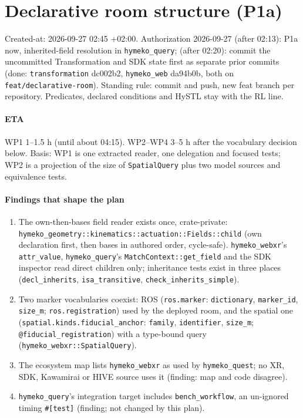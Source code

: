 \documentclass[11pt]{article}
\begin{document}
\section*{Declarative room structure (P1a)}
Created-at: 2026-09-27 02:45 +02:00. Authorization 2026-09-27 (after 02:13): P1a now, inherited-field
resolution in \texttt{hymeko\_query}; (after 02:20): commit the uncommitted Transformation and SDK state
first as separate prior commits (done: \texttt{transformation} dc002b2, \texttt{hymeko\_web}
da94b0b, both on \texttt{feat/declarative-room}). Standing rule: commit and push, new feat branch
per repository. Predicates, declared conditions and HySTL stay with the RL line.

\paragraph{ETA} WP1 1--1.5 h (until about 04:15). WP2--WP4 3--5 h after the vocabulary decision
below. Basis: WP1 is one extracted reader, one delegation and focused tests; WP2 is a projection
of the size of \texttt{SpatialQuery} plus two model sources and equivalence tests.

\paragraph{Findings that shape the plan}
\begin{enumerate}
\item The own-then-bases field reader exists once, crate-private:
  \texttt{hymeko\_geometry::kinematics::actuation::Fields::child} (own declaration first, then
  bases in authored order, cycle-safe). \texttt{hymeko\_webxr}'s \texttt{attr\_value},
  \texttt{hymeko\_query}'s \texttt{MatchContext::get\_field} and the SDK inspector read direct
  children only; inheritance tests exist in three places (\texttt{decl\_inherits},
  \texttt{isa\_transitive}, \texttt{check\_inherits\_simple}).
\item Two marker vocabularies coexist: ROS (\texttt{ros.marker}: \texttt{dictionary},
  \texttt{marker\_id}, \texttt{size\_m}; \texttt{ros.registration}) used by the deployed room, and
  the spatial one (\texttt{spatial.kinds.fiducial\_anchor}: \texttt{family}, \texttt{identifier},
  \texttt{size\_m}; \texttt{@fiducial\_registration}) with a type-bound query
  (\texttt{hymeko\_webxr::SpatialQuery}).
\item The ecosystem map lists \texttt{hymeko\_webxr} as used by \texttt{hymeko\_quest}; no XR, SDK,
  Kawamirai or HIVE source uses it (finding: map and code disagree).
\item \texttt{hymeko\_query}'s integration target includes \texttt{bench\_workflow}, an un-ignored
  timing \texttt{\#[test]} (finding; not changed by this plan).
\end{enumerate}
\end{document}
